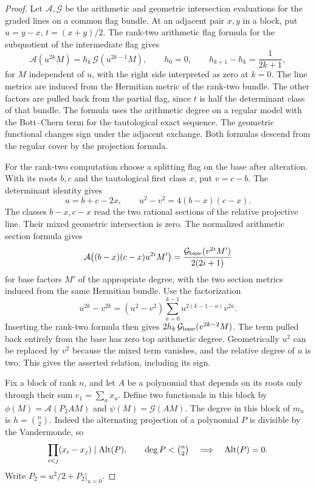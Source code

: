 \begin{proof}
Let \(\mathcal A,\mathcal G\) be the arithmetic and geometric
intersection evaluations for the graded lines on a common
flag bundle. At an adjacent pair \(x,y\) in a block, put
\(u=y-x\), \(t=(x+y)/2\). The rank-two arithmetic flag
formula for the subquotient of the intermediate flag gives
\[
 \mathcal A(u^{2k}M)=h_k\,\mathcal G(u^{2k-1}M),
 \qquad h_0=0,\qquad h_{k+1}-h_k=\frac{1}{2k+1},
\]
for \(M\) independent of \(u\), with the right side interpreted
as zero at \(k=0\). The line metrics are induced from the
Hermitian metric of the rank-two bundle. The other factors
are pulled back from the partial flag, since \(t\) is half
the determinant class of that bundle. The formula uses
the arithmetic degree on a regular model with the
Bott--Chern term for the tautological exact sequence.
The geometric functional changes sign under the adjacent
exchange. Both formulas descend from the regular cover
by the projection formula. \label{cor:covolume-flag-test-4}

For the rank-two computation choose a splitting flag
on the base after alteration. With its roots \(b,c\)
and the tautological first class \(x\), put \(v=c-b\).
The determinant identity gives \[
 u=b+c-2x,\qquad u^2-v^2=4(b-x)(c-x).
\]
The classes \(b-x,c-x\) read the two rational sections
of the relative projective line. Their mixed geometric
intersection is zero. The normalized arithmetic
section formula gives
\[
 \mathcal A\bigl((b-x)(c-x)u^{2i}M'\bigr)
       =\frac{\mathcal G_{\rm base}(v^{2i}M')}{2(2i+1)}
\]
for base factors \(M'\) of the appropriate degree,
with the two section metrics induced from the same
Hermitian bundle. Use the factorization
\[
 u^{2k}-v^{2k}=(u^2-v^2)\sum_{a=0}^{k-1}u^{2(k-1-a)}v^{2a}.
\]
Inserting the rank-two formula then gives \(2h_k\,\mathcal G_{\rm base}(v^{2k-2}M)\).
The term pulled back entirely from the base has zero
top arithmetic degree. Geometrically \(u^2\) can be
replaced by \(v^2\) because the mixed term vanishes,
and the relative degree of \(u\) is two. This gives
the asserted relation, including its sign.
\label{cor:covolume-flag-test-5}

Fix a block of rank \(n\), and let \(A\) be a polynomial
that depends on its roots only through their sum
\(e_1=\sum_a x_a\). Define two functionals in this block
by \(\phi(M)=\mathcal A(P_2 A M)\) and
\(\psi(M)=\mathcal G(A M)\). The degree in this block
of \(m_n\) is \(h=\binom n2\). Indeed the alternating projection of a polynomial \(P\) is divisible by the Vandermonde, so
\[
 \prod_{i<j}(x_i-x_j)\mid\operatorname{Alt}(P),\qquad \deg P<\tbinom n2\quad\Longrightarrow\quad\operatorname{Alt}(P)=0.
\]
Write \(P_2=u^2/2+P_2|_{u=0}\).


\end{proof}
